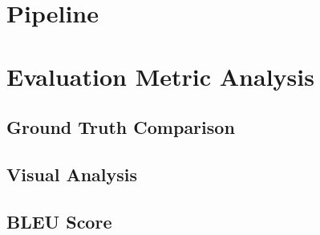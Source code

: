 \section{Pipeline}

\section{Evaluation Metric Analysis}

\subsection{Ground Truth Comparison}

\subsection{Visual Analysis}

\subsection{BLEU Score}
\cite{Callison-Burch}
